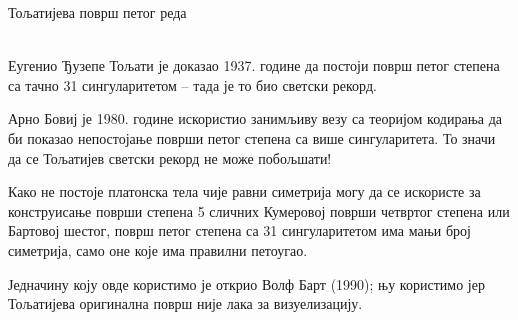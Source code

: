 ﻿\documentclass[en]{./../../common/SurferDesc}%
\begin{document}
\footnotesize


\begin{surferPage}
  \begin{surferTitle}Тољатијева површ петог реда\end{surferTitle}  \\

    Еугенио Ђузепе Тољати је доказао 1937. године да постоји површ петог степена са тачно 
	31 сингуларитетом – тада је то био светски рекорд.


    Арно Бовиј је 1980. године искористио занимљиву везу са теоријом кодирања да би 
	показао непостојање површи петог степена са више сингуларитета. 
    То значи да се Тољатијев светски рекорд не може побољшати!

    Како не постоје платонска тела чије равни симетрија могу да се искористе за 
	конструисање површи степена 5 сличних Кумеровој површи четвртог степена или 
	Бартовој шестог, површ петог степена са 31 сингуларитетом има мањи број симетрија, 
	само оне које има правилни петоугао.


 Једначину коју овде користимо је открио Волф Барт (1990); њу користимо јер 
 Тољатијева оригинална површ није лака за визуелизацију.




  \begin{surferText}
     \end{surferText}
\end{surferPage}
\end{document}
